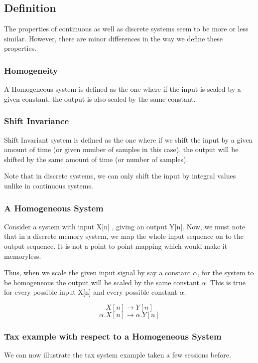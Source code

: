 \subsection{Definition}
The properties of continuous as well as discrete systems seem to be more or less similar. However, there are minor differences in the way we define these properties.

\subsubsection{Homogeneity}
A Homogeneous system is defined as the one where if the input is scaled by a given constant, the output is also scaled by the same constant.


\subsubsection{Shift Invariance}
Shift Invariant system is defined as the one where if we shift the input by a given amount of time (or given number of samples in this case), the output will be shifted by the same amount of time (or number of samples). 

Note that in discrete systems, we can only shift the input by integral values unlike in continuous systems. 




\subsubsection{A Homogeneous System}

Consider a system with input X[n] , giving an output Y[n]. Now, we must note that in a discrete memory system, we map the whole input sequence on to the output sequence. It is not a point to point mapping which would make it memoryless. 

Thus, when we scale the given input signal by say a constant $\alpha$, for the system to be homogeneous the output will be scaled by the same constant $\alpha$. This is true for every possible input X[n] and every possible constant $\alpha$. 

$$X[n]\rightarrow Y[n]$$
$${\alpha.X[n]}\rightarrow {\alpha.Y[n]}$$

\subsubsection{Tax example with respect to a Homogeneous System}
We can now illustrate the tax system example taken a few sessions before. 

